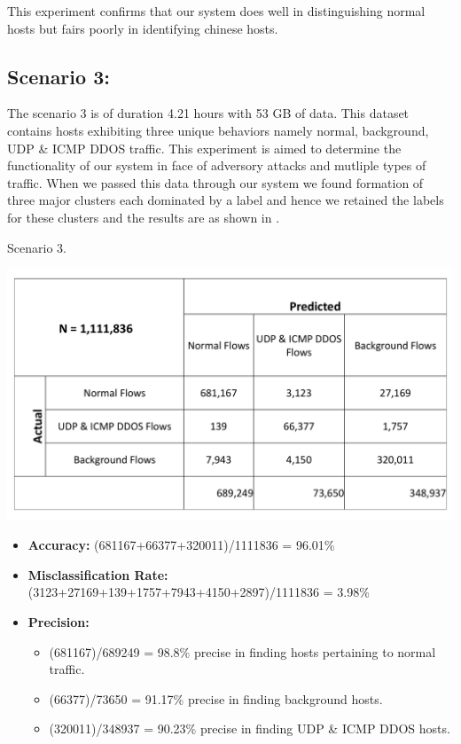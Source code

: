 This experiment confirms that our system does well in distinguishing normal hosts but fairs poorly in identifying chinese hosts.

\subsection{Scenario 3:}
The scenario 3 is of duration 4.21 hours with 53 GB of data. This dataset contains hosts exhibiting three unique behaviors namely normal, background, UDP \& ICMP DDOS  traffic. This experiment is aimed to determine the functionality of our system in face of adversory attacks and mutliple types of traffic. When we passed this data through our system we found formation of three major clusters each dominated by a label and hence we retained the labels for these clusters and the results are as shown in .

\begin{table}[t]
	\caption{Scenario 3.}%
	\centerline{\includegraphics[scale = 0.5]{scenario3.pdf}}	
\end{table}

\begin{itemize}
	\item \textbf{Accuracy:}  (681167+66377+320011)/1111836 = 96.01\%
	
	\item \textbf{Misclassification Rate:} (3123+27169+139+1757+7943+4150+2897)/1111836 = 3.98\%
	
	\item \textbf{Precision:} 
	\begin{itemize}	
		
		
		\item (681167)/689249 = 98.8\% precise in finding hosts pertaining to normal traffic.
		
		\item (66377)/73650 = 91.17\% precise in finding background hosts.
		
		\item (320011)/348937 = 90.23\% precise in finding UDP \& ICMP DDOS hosts.
		
	\end{itemize}
	
\end{itemize}

